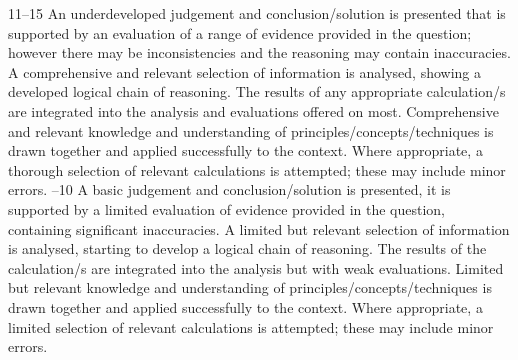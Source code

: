 \documentclass{article}
\begin{document}
11–15 \newline
An underdeveloped judgement and conclusion/solution is presented that is \newline
supported by an evaluation of a range of evidence provided in the question; however \newline
there may be inconsistencies and the reasoning may contain inaccuracies. \newline
 \newline
A comprehensive and relevant selection of information is analysed, showing a \newline
developed logical chain of reasoning.  The results of any appropriate calculation/s \newline
are integrated into the analysis and evaluations offered on most.  \newline
 \newline
Comprehensive and relevant knowledge and understanding of \newline
principles/concepts/techniques is drawn together and applied successfully to the \newline
context.  Where appropriate, a thorough selection of relevant calculations is \newline
attempted; these may include minor errors.  –10 \newline
A basic judgement and conclusion/solution is presented, it is supported by a limited \newline
evaluation of evidence provided in the question, containing significant inaccuracies.  \newline
 \newline
A limited but relevant selection of information is analysed, starting to develop a \newline
logical chain of reasoning.  The results of the calculation/s are integrated into the \newline
analysis but with weak evaluations.  \newline
 \newline
Limited but relevant knowledge and understanding of principles/concepts/techniques \newline
is drawn together and applied successfully to the context.  Where appropriate, a \newline
limited selection of relevant calculations is attempted; these may include minor \newline
errors. \newline
\end{document}
